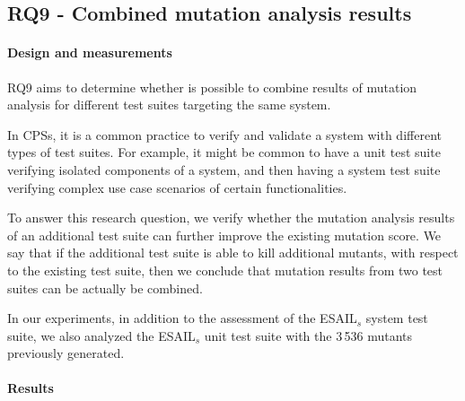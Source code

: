 

\clearpage
\subsection{RQ9 - Combined mutation analysis results}
\label{sec:exp:thr}

\STARTCHANGEDWPT
\paragraph{Design and measurements}


RQ9 aims to determine whether is possible to combine results of mutation analysis for different test suites targeting the same system.

In CPSs, it is a common practice to verify and validate a system with different types of test suites. For example, it might be common to have a unit test suite verifying isolated components of a system, and then having a system test suite verifying complex use case scenarios of certain functionalities.

To answer this research question, we verify whether the mutation analysis results of an additional test suite can further improve the existing mutation score. We say that if the additional test suite is able to kill additional mutants, with respect to the existing test suite, then we conclude that mutation results from two test suites can be actually be combined.

In our experiments, in addition to the assessment of the ESAIL$_s$ system test suite, we also analyzed the ESAIL$_s$ unit test suite with the 3\,536 mutants previously generated.

\paragraph{Results}


